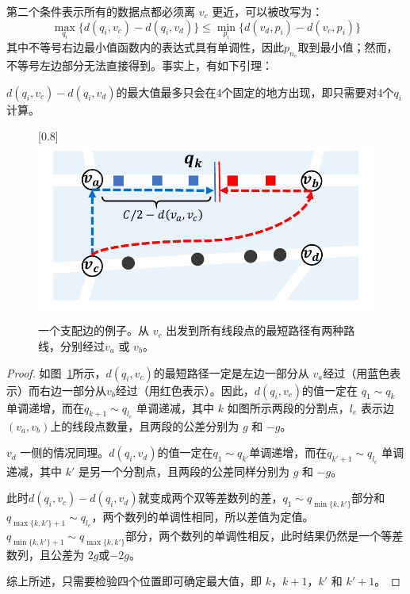 第二个条件表示所有的数据点都必须离 $v_c$ 更近，可以被改写为：
\begin{equation*}
    \max_{q_i}\{d(q_i, v_c) - d(q_i, v_d)\} \le \min_{p_i}\{d(v_d, p_i) - d(v_c, p_i)\}
\end{equation*} 
其中不等号右边最小值函数内的表达式具有单调性，因此$p_{n_e}$取到最小值；然而，不等号左边部分无法直接得到。事实上，有如下引理：
\begin{lemma}
    \label{lemma:LS_1}
    $d(q_i, v_c) - d(q_i, v_d)$的最大值最多只会在4个固定的地方出现，即只需要对4个$q_i$计算。
\end{lemma}
\begin{figure}[h]\centering
    \scalebox{0.8}[0.8]{\includegraphics{./figures/LS_2.pdf}}
    \caption{一个支配边的例子。从 $v_c$ 出发到所有线段点的最短路径有两种路线，分别经过$v_a$ 或 $v_b$。}
    \label{fig:LS_2}
\end{figure}
\begin{proof}
    如图~\ref{fig:LS_2}所示，$d(q_i, v_c)$的最短路径一定是左边一部分从 $v_a$经过（用蓝色表示）而右边一部分从$v_b$经过（用红色表示）。因此，$d(q_i, v_c)$的值一定在 $q_1 \sim q_k$ 单调递增，而在$q_{k+1} \sim q_{l_e}$ 单调递减，其中 $k$ 如图所示两段的分割点，$l_e$ 表示边$(v_a, v_b)$上的线段点数量，且两段的公差分别为 $g$ 和 $-g$。

    $v_d$ 一侧的情况同理。$d(q_i, v_d)$的值一定在$q_1 \sim q_{k'}$单调递增，而在$q_{{k'}+1} \sim q_{l_e}$ 单调递减，其中 $k'$ 是另一个分割点，且两段的公差同样分别为 $g$ 和 $-g$。

    此时$d(q_i, v_c) - d(q_i, v_d)$就变成两个双等差数列的差，$q_1 \sim q_{\min\{k,k'\}}$部分和$q_{\max\{k,k'\}+1} \sim q_{l_e}$，两个数列的单调性相同，所以差值为定值。$q_{\min\{k,k'\}+1} \sim q_{\max\{k,k'\}}$部分，两个数列的单调性相反，此时结果仍然是一个等差数列，且公差为 $2g$或$-2g$。

    综上所述，只需要检验四个位置即可确定最大值，即 $k$，$k+1$，$k'$ 和 $k'+1$。
\end{proof}


